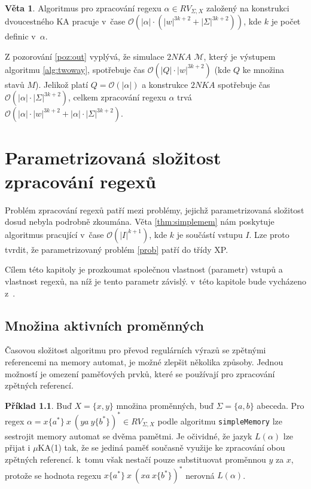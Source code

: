 \documentclass[thesis=B,czech]{FITthesis}[2019/12/23]
\theoremstyle{definition}
\newtheorem{example}{Příklad}[chapter]
\newtheorem{theorem}{Věta}[chapter]
\begin{document}
\begin{theorem}\label{thm:ctime}Algoritmus pro zpracování regexu $\alpha \in RV_{\Sigma, X}$ založený na konstrukci dvoucestného KA pracuje v~čase $\mathcal{O}(|\alpha|\cdot(|w|^{3k+2} + |\Sigma|^{3k+2}))$, kde $k$ je počet definic v~$\alpha$. \end{theorem}
Z pozorování \ref{poz:out} vyplývá, že simulace $2NKA$ $\mathcal{M}$, který je výstupem algoritmu \ref{alg:twoway}, spotřebuje čas $\mathcal{O}(|Q|\cdot|w|^{3k+2})$ (kde $Q$ ke množina stavů $M$). Jelikož platí $Q=\mathcal{O}(|\alpha|)$ a konstrukce $2NKA$ spotřebuje čas $\mathcal{O}(|\alpha|\cdot|\Sigma|^{3k+2})$, celkem zpracování regexu $\alpha$ trvá $\mathcal{O}(|\alpha|\cdot|w|^{3k+2} + |\alpha|\cdot|\Sigma|^{3k+2})$.
\fi
\chapter{Parametrizovaná složitost zpracování regexů}

Problém zpracování regexů patří mezi problémy, jejichž parametrizovaná složitost dosud nebyla podrobně zkoumána. Věta \ref{thm:simplemem} nám poskytuje algoritmus pracující v~čase $\mathcal{O}(|I|^{k+1})$, kde $k$ je součástí vstupu $I$. Lze proto tvrdit, že parametrizovaný problém \ref{prob} patří do třídy XP.

Cílem této kapitoly je prozkoumat společnou vlastnost (parametr) vstupů a vlastnost regexů, na níž je tento parametr závislý. v~této kapitole bude vycházeno z~\cite{schmidref}.

\section{Množina aktivních proměnných}

Časovou složitost algoritmu pro převod regulárních výrazů se zpětnými referencemi na memory automat, je možné zlepšit několika způsoby. Jednou možností je omezení paměťových prvků, které se používají pro zpracování zpětných referencí.  

\begin{example}\label{ex:avd}
Buď $X=\{x, y\}$ množina proměnných, buď $\Sigma=\{a, b\} $ abeceda. Pro regex $\alpha = x \{a^\ast\} \ x \ ( y a \ y \{b^\ast\})^\ast \in RV_{\Sigma, X}$ podle algoritmu \texttt{simpleMemory} lze sestrojit memory automat se dvěma pamětmi. Je očividné, že jazyk $L(\alpha)$ lze přijat i $\mu$KA(1) tak, že se jediná paměť současně využije ke zpracování obou zpětných referencí. k~tomu však nestačí pouze substituovat proměnnou $y$ za $x$, protože se hodnota regexu $ x \{a^\ast\} \ x \ ( xa \ x \{b^\ast\})^\ast$ nerovná $L(\alpha)$. 
\end{example}
\end{document}

